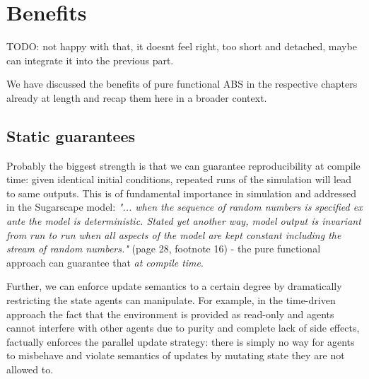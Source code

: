 \section{Benefits}
TODO: not happy with that, it doesnt feel right, too short and detached, maybe can integrate it into the previous part.

We have discussed the benefits of pure functional ABS in the respective chapters already at length and recap them here in a broader context.


\subsection{Static guarantees}
Probably the biggest strength is that we can guarantee reproducibility at compile time: given identical initial conditions, repeated runs of the simulation will lead to same outputs. This is of fundamental importance in simulation and addressed in the Sugarscape model: \textit{"... when the sequence of random numbers is specified ex ante the model is deterministic. Stated yet another way, model output is invariant from run to run when all aspects of the model are kept constant including the stream of random numbers."} (page 28, footnote 16) - the pure functional approach can guarantee that \textit{at compile time}.

Further, we can enforce update semantics to a certain degree by dramatically restricting the state agents can manipulate. For example, in the time-driven approach the fact that the environment is provided as read-only and agents cannot interfere with other agents due to purity and complete lack of side effects, factually enforces the parallel update strategy: there is simply no way for agents to misbehave and violate semantics of updates by mutating state they are not allowed to.

